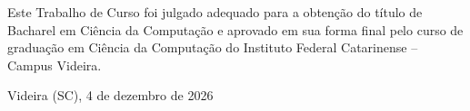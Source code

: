 \begin{folhadeaprovacao}

  \begin{center}
  \vspace*{-1.2cm}
    \textbf{\large\imprimirautor}

    \vspace*{\fill}\vspace*{\fill}\vspace*{\fill}
    \parbox{15cm}{
        \OnehalfSpacing\centering\large\textbf{\imprimirtitulo}
    }
    \vspace*{\fill}\vspace*{\fill}

    \hspace{.45\textwidth}
    \begin{minipage}{.5\textwidth}
        Este Trabalho de Curso foi julgado
        adequado para a obtenção do título de
        Bacharel em Ciência da Computação e
        aprovado em sua forma final pelo curso de
        graduação em Ciência da Computação do Instituto Federal Catarinense
        – Campus Videira.

    \end{minipage}%
    \vspace*{\fill}
   \end{center}
    \vspace{-1cm}
  \begin{center}
   Videira (SC), 4 de dezembro de 2026
  \end{center}






\end{folhadeaprovacao}
